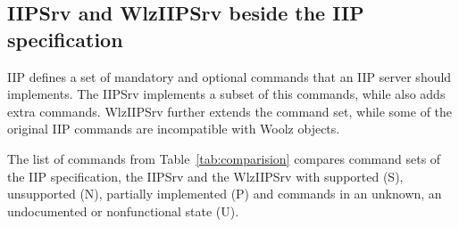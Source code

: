 \documentclass[11pt]{article}
\begin{document}
\subsection{IIPSrv and WlzIIPSrv beside the IIP specification}

IIP \cite[p.25]{IIP97} defines a set of mandatory and optional commands that an IIP server should implements.
The IIPSrv implements a subset of this commands, while also adds extra commands. WlzIIPSrv further extends the command set, while some of the original IIP commands are incompatible with Woolz objects.

The list of commands from Table~\ref{tab:comparision} compares command sets of the IIP specification, the IIPSrv and the WlzIIPSrv with supported (S), unsupported (N), partially implemented (P) and commands in an unknown, an undocumented or nonfunctional state (U).
\end{document}
